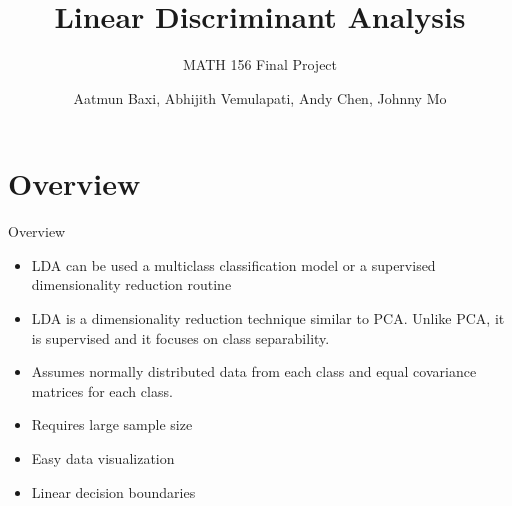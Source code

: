 \documentclass[9pt]{beamer}
\title{Linear Discriminant Analysis}
\subtitle{MATH 156 Final Project}
\author{Aatmun Baxi, Abhijith Vemulapati, Andy Chen, Johnny Mo}
\institute{University of California, Los Angeles}
\begin{document}
\titlepage
\section{Overview}
\begin{frame}{Overview}
\begin{itemize}
    \item LDA can be used a multiclass classification model or a supervised dimensionality reduction routine
    \item LDA is a dimensionality reduction technique similar to PCA. Unlike PCA, it is supervised and it focuses on class separability. 
    \item Assumes normally distributed data from each class and equal covariance matrices for each class.
    \item Requires large sample size
    \item Easy data visualization
    \item Linear decision boundaries
\end{itemize}
\end{frame}
\end{document}
